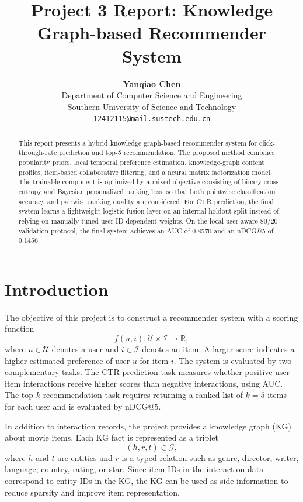 \documentclass[onecolumn,a4paper,12pt]{IEEEtran}
\title{\textbf{Project 3 Report: Knowledge Graph-based Recommender System}}
\author{\textbf{Yanqiao Chen}\\
        Department of Computer Science and Engineering\\
        Southern University of Science and Technology\\
        \texttt{12412115@mail.sustech.edu.cn}}
\begin{document}
\maketitle

\begin{abstract}
This report presents a hybrid knowledge graph-based recommender system for click-through-rate prediction and top-5 recommendation. The proposed method combines popularity priors, local temporal preference estimation, knowledge-graph content profiles, item-based collaborative filtering, and a neural matrix factorization model. The trainable component is optimized by a mixed objective consisting of binary cross-entropy and Bayesian personalized ranking loss, so that both pointwise classification accuracy and pairwise ranking quality are considered. For CTR prediction, the final system learns a lightweight logistic fusion layer on an internal holdout split instead of relying on manually tuned user-ID-dependent weights. On the local user-aware 80/20 validation protocol, the final system achieves an AUC of 0.8570 and an nDCG@5 of 0.1456.
\end{abstract}

\section{Introduction}

The objective of this project is to construct a recommender system with a scoring function
\begin{equation}
    f(u,i): \mathcal{U}\times \mathcal{I} \rightarrow \mathbb{R},
\end{equation}
where $u\in\mathcal{U}$ denotes a user and $i\in\mathcal{I}$ denotes an item. A larger score indicates a higher estimated preference of user $u$ for item $i$. The system is evaluated by two complementary tasks. The CTR prediction task measures whether positive user--item interactions receive higher scores than negative interactions, using AUC. The top-$k$ recommendation task requires returning a ranked list of $k=5$ items for each user and is evaluated by nDCG@5.

In addition to interaction records, the project provides a knowledge graph (KG) about movie items. Each KG fact is represented as a triplet
\begin{equation}
    (h,r,t)\in\mathcal{G},
\end{equation}
where $h$ and $t$ are entities and $r$ is a typed relation such as genre, director, writer, language, country, rating, or star. Since item IDs in the interaction data correspond to entity IDs in the KG, the KG can be used as side information to reduce sparsity and improve item representation.
\end{document}
